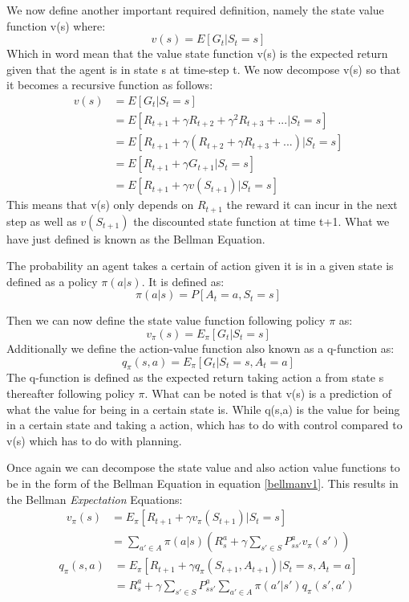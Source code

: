 We now define another important required definition, namely the state value function v(s) where:
\[v(s) = E[G_t | S_t = s]\]
Which in word mean that the value state function v(s) is the expected return given that the agent is in state s at time-step t.
We now decompose v(s) so that it becomes a recursive function as follows:
\begin{align}
	v(s) &= E[G_t | S_t = s]\\
	&= E[R_{t+1} + \gamma R_{t+2} + \gamma^{2} R_{t+3} + ...|S_t = s]\\
	&= E[R_{t+1} + \gamma (R_{t+2} + \gamma R_{t+3} + ...)|S_t = s]\\
	&= E[R_{t+1} + \gamma G_{t+1}|S_t = s]\\
	&= E[R_{t+1} + \gamma v(S_{t+1})|S_t = s]
	\label{bellmanv1}
\end{align}
This means that v(s) only depends on $R_{t+1}$ the reward it can incur in the next step as well as $v(S_{t+1})$ the discounted state function at time t+1.
What we have just defined is known as the Bellman Equation.\cite{sutton_barto}

The probability an agent takes a certain of action given it is in a given state is defined as a policy $\pi(a|s)$. It is defined as:
\[\pi(a|s) = P[A_t = a, S_t = s]\]

Then we can now define the state value function following policy $\pi$ as:
\[v_{\pi}(s) = E_{\pi}[G_t | S_t = s]\]
Additionally we define the action-value function also known as a q-function as:
\[q_{\pi}(s,a) = E_{\pi}[G_t | S_t = s,A_t = a]\]
The q-function is defined as the expected return taking action a from state s thereafter following policy $\pi$. What can be noted is that v(s) is a prediction of what the value for being in a certain state is. While q(s,a) is the value for being in a certain state and taking a action, which has to do with control compared to v(s) which has to do with planning. 

Once again we can decompose the state value and also action value functions to be in the form of the Bellman Equation in equation \ref{bellmanv1}. This results in the Bellman \textit{Expectation} Equations:
\begin{align}
	v_{\pi}(s)	&= E_{\pi}[R_{t+1} + \gamma v_{\pi}(S_{t+1})|S_t = s]\\
	&= \sum_{a'\in A}\pi(a|s)(R^{a}_s+\gamma\sum_{s'\in S}P^{a}_{ss'}v_\pi(s'))
	\label{bellmanv2}
\end{align}
\begin{align}
	q_{\pi}(s,a)	&= E_{\pi}[R_{t+1} + \gamma q_{\pi}(S_{t+1},A_{t+1})|S_t = s,A_t = a]\\
	&= R^{a}_s +\gamma \sum_{s'\in S}P^{a}_{ss'}\sum_{a'\in A}\pi(a'|s')q_\pi(s',a')
	\label{bellmanq}
\end{align}

